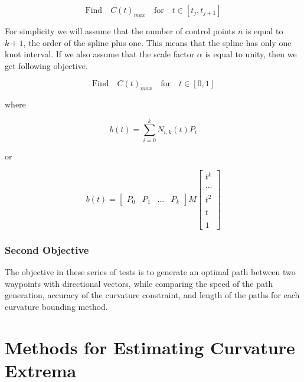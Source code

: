 \documentclass{article}
\begin{document}
\begin{equation}
    \text{Find} \quad C(t)_{max} \quad \text{for} \quad t \in [t_j,t_{j+1}]
\end{equation}

For simplicity we will assume that the number of control points \(n\) is equal to \(k + 1\), the order of the spline plus one. This means that the spline has only one knot interval. If we also assume that the scale factor \(\alpha\) is equal to unity, then we get following objective.

\begin{equation}
    \text{Find} \quad C(t)_{max} \quad \text{for} \quad t \in [0,1]
\end{equation}

where

   \begin{equation} \label{eq:B-Spline equation}
      b(t) = \sum^{k}_{i=0} N_{i,k}(t) P_i
  \end{equation}
  
  or
  
  \begin{equation}
    b(t) = \begin{bmatrix} P_{0} & P_{1} & ... & P_{k}\end{bmatrix} M \begin{bmatrix} t^k \\ \\ ... \\ \\ t^2 \\ \\ t \\ \\ 1 \end{bmatrix}
\end{equation}

\subsubsection{Second Objective}

The objective in these series of tests is to generate an optimal path between two waypoints with directional vectors, while comparing the speed of the path generation, accuracy of the curvature constraint, and length of the paths for each curvature bounding method.

\section{Methods for Estimating Curvature Extrema}
\end{document}
